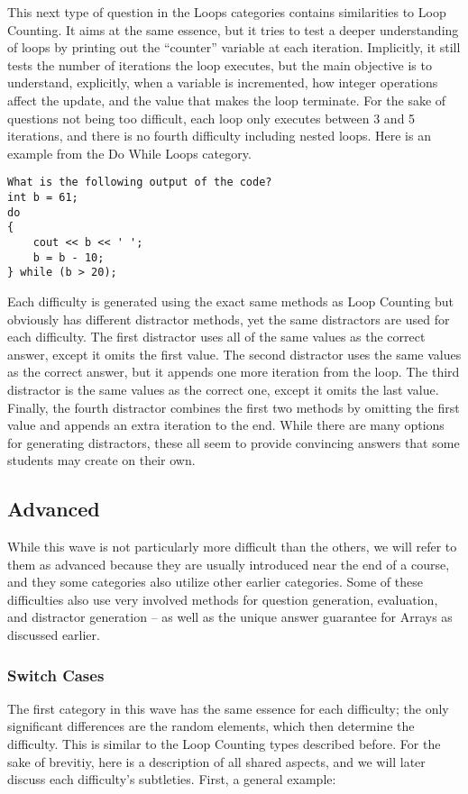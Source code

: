 \documentclass{article}
\begin{document}
This next type of question in the Loops categories contains similarities to Loop Counting. It aims at the same essence, but it tries to test a deeper understanding of loops by printing out the 
``counter'' variable at each iteration. Implicitly, it still tests the number of iterations the loop executes, but the main objective is to understand, explicitly, when a variable is incremented,
how integer operations affect the update, and the value that makes the loop terminate. For the sake of questions not being too difficult, each loop only executes between 3 and 5 iterations, and there is no fourth difficulty including nested loops. Here is an example from the Do While Loops category.

\begin{lstlisting}
What is the following output of the code? 
int b = 61; 
do
{ 
	cout << b << ' '; 
	b = b - 10; 
} while (b > 20); 
\end{lstlisting}

Each difficulty is generated using the exact same methods as Loop Counting but obviously has different distractor methods, yet the same distractors are used for each difficulty. The first 
distractor uses all of the same values as the correct answer, except it omits the first value. The second distractor uses the same values as the correct answer, but it appends one more iteration
from the loop. The third distractor is the same values as the correct one, except it omits the last value. Finally, the fourth distractor combines the first two methods by omitting the first value
and appends an extra iteration to the end. While there are many options for generating distractors, these all seem to provide convincing answers that some students may create on their own.

\subsection{Advanced}

While this wave is not particularly more difficult than the others, we will refer to them as advanced because they are usually introduced near the end of a course, and they some categories also 
utilize other earlier categories. Some of these difficulties also use very involved methods for question generation, evaluation, and distractor generation -- as well as the unique answer guarantee 
for Arrays as discussed earlier. 

\subsubsection{Switch Cases}
The first category in this wave has the same essence for each difficulty; the only significant differences are the random elements, which then determine the difficulty. This is similar to the Loop 
Counting types described before. For the sake of brevitiy, here is a description of all shared aspects, and we will later discuss each difficulty's subtleties. First, a general example:
\end{document}
